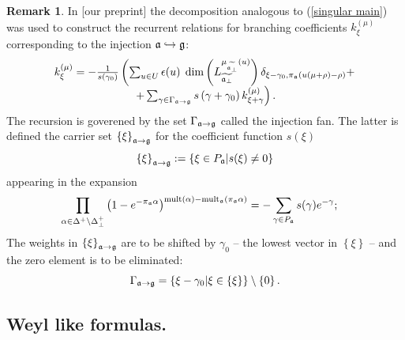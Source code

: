 \documentclass[12pt]{article}
\theoremstyle{definition}
\newtheorem{remark}{Remark}
\begin{document}
\begin{remark}
In [our preprint] the decomposition analogous to (\ref{singular main}) was
used to construct the recurrent relations for branching coefficients $k_{\xi
}^{\left( \mu \right) }$ corresponding to the injection $\frak{a}%
\hookrightarrow \frak{g}$:
\[
\begin{array}{c}
k_{\xi }^{\left( \mu \right) }=-\frac{1}{s\left( \gamma _{0}\right) }\left(
\sum_{u\in U}\epsilon (u)\;\dim \left( L_{\widetilde{\frak{a}_{\perp }}%
}^{\mu _{\widetilde{\frak{a}_{\perp }}}\left( u\right) }\right) \delta _{\xi
-\gamma _{0},\pi _{\frak{a}}(u(\mu +\rho )-\rho )}+\right.  \\
\left. +\sum_{\gamma \in \Gamma _{\frak{a}\rightarrow \frak{g}}}s\left(
\gamma +\gamma _{0}\right) k_{\xi +\gamma }^{\left( \mu \right) }\right) .
\end{array}
\]
The recursion is goverened by the set $\Gamma _{\frak{a}\rightarrow \frak{g}}
$ called the injection fan. The latter is defined the carrier set $\left\{
\xi \right\} _{\frak{a}\rightarrow \frak{g}}$ for the coefficient function $%
s(\xi )$
\[
\left\{ \xi \right\} _{\frak{a}\rightarrow \frak{g}}:=\left\{ \xi \in P_{%
\frak{a}}|s(\xi )\neq 0\right\}
\]
appearing in the expansion
\begin{equation}
\prod_{\alpha \in \Delta ^{+}\setminus \Delta _{\bot }^{+}}\left( 1-e^{-\pi
_{\frak{a}}\alpha }\right) ^{\mathrm{mult}(\alpha )-\mathrm{mult}_{\frak{a}%
}(\pi _{\frak{a}}\alpha )}=-\sum_{\gamma \in P_{\frak{a}}}s(\gamma
)e^{-\gamma };\quad
\end{equation}
The weights in $\left\{ \xi \right\} _{\frak{a}\rightarrow \frak{g}}$ are to
be shifted by $\gamma _{0}$ -- the lowest vector in $\left\{ \xi \right\} $
-- and the zero element is to be eliminated:
\begin{equation}
\Gamma _{\frak{a}\rightarrow \frak{g}}=\left\{ \xi -\gamma _{0}|\xi \in
\left\{ \xi \right\} \right\} \setminus \left\{ 0\right\} .
\end{equation}
\end{remark}

\subsection{Weyl like formulas.}
\end{document}
